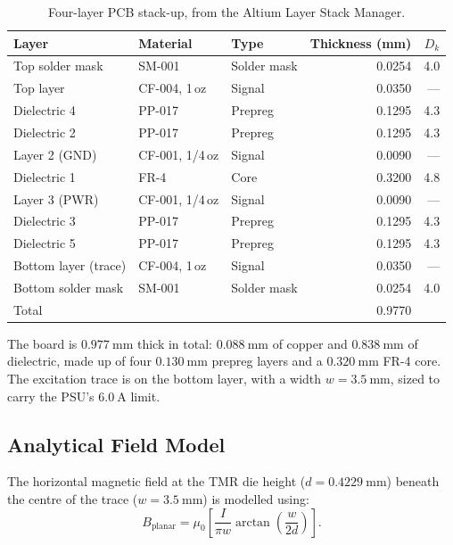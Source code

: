 \documentclass[12pt,a4paper]{article}
\begin{document}
\begin{table}[H]
\centering
\caption{Four-layer PCB stack-up, from the Altium Layer Stack Manager.}
\label{tab:stackup}
\begin{tabular}{@{}lllrr@{}}
\toprule
Layer & Material & Type & Thickness (mm) & $D_k$ \\
\midrule
Top solder mask & SM-001 & Solder mask & 0.0254 & 4.0 \\
Top layer & CF-004, 1\,oz & Signal & 0.0350 & --- \\
Dielectric 4 & PP-017 & Prepreg & 0.1295 & 4.3 \\
Dielectric 2 & PP-017 & Prepreg & 0.1295 & 4.3 \\
Layer 2 (GND) & CF-001, 1/4\,oz & Signal & 0.0090 & --- \\
Dielectric 1 & FR-4 & Core & 0.3200 & 4.8 \\
Layer 3 (PWR) & CF-001, 1/4\,oz & Signal & 0.0090 & --- \\
Dielectric 3 & PP-017 & Prepreg & 0.1295 & 4.3 \\
Dielectric 5 & PP-017 & Prepreg & 0.1295 & 4.3 \\
Bottom layer (trace) & CF-004, 1\,oz & Signal & 0.0350 & --- \\
Bottom solder mask & SM-001 & Solder mask & 0.0254 & 4.0 \\
\midrule
Total & & & 0.9770 & \\
\bottomrule
\end{tabular}
\end{table}
 
The board is $\SI{0.977}{\milli\metre}$ thick in total: $\SI{0.088}{\milli\metre}$ of copper and $\SI{0.838}{\milli\metre}$ of dielectric, made up of four $\SI{0.130}{\milli\metre}$ prepreg layers and a $\SI{0.320}{\milli\metre}$ FR-4 core. The excitation trace is on the bottom layer, with a width $w = \SI{3.5}{\milli\metre}$, sized to carry the PSU's $\SI{6.0}{\ampere}$ limit.

\subsection{Analytical Field Model}
\label{sec:field-model}

The horizontal magnetic field at the TMR die height (\(d = \SI{0.4229}{\milli\metre}\)) beneath the centre of the trace (\(w = \SI{3.5}{\milli\metre}\)) is modelled using:
\begin{equation}
B_{\text{planar}} = \mu_0 \left[ \frac{I}{\pi w} \arctan\left( \frac{w}{2d} \right) \right].
\label{eq:planar}
\end{equation}
\end{document}
